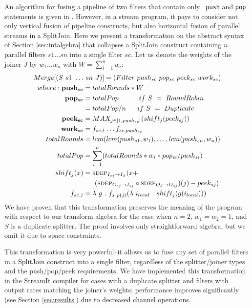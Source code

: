An algorithm for fusing a pipeline of two filters that contain only {\tt
push} and {\tt pop} statements is given in \cite{pro96}.  However, in a
stream program, it pays to consider not only vertical fusion of pipeline
constructs, but also horizontal fusion of parallel streams in a
SplitJoin.  Here we present a transformation on the abstract syntax of
Section \ref{sec:intalgebra} that collapses a SplitJoin construct
containing $n$ parallel filters $s1 \dots sn$ into a single filter $sc$.
Let us denote the weights of the joiner $J$ by $w_1 \dots w_n$ with $W =
\sum_{i=1}^{n}{w_i}$:
\begin{align*}
Merge[(S~s1~\dots&~sn~J)] = (Filter~push_{sc}~pop_{sc}~peek_{sc}~work_{sc}) \\
where: {\bf push_{sc}} &= totalRounds * W \\
       {\bf pop_{sc}} &= totalPop ~~~~~~~~~if~S~=~RoundRobin \\
                &= totalPop / n ~~~~~if~S~=~Duplicate \\
       {\bf peek_{sc}} &= MAX_{j \in [1,push_{sc}]}(shift_j(peek_{sj})) \\
       {\bf work_{sc}} &= f_{sc, 1} \dots f_{sc, push_{sc}} \\
       totalRounds &= lcm(lcm(push_{s1}, w_1), \dots, lcm(push_{sn},
       w_n)) \\
       totalPop &= \sum_{i=1}^{n}(totalRounds * w_i * pop_{si} / push_{si}) \\
       shift_j(x) &= \mi{I_S}{I_{sj}}(x + \\ &~~~~~(\mi{I_{sj}}{O_{sj}} \circ \mi{O_{sj}}{O_J})(j)-peek_{sj}) \\
       f_{sc, j} &= \la~g~.~f_{s~p(j)}(\la~i_{local}~.~shift_j(g(i_{local})))
\end{align*}
We have proven that this transformation preserves the meaning of the
program with respect to our transform algebra for the case when $n = 2$,
$w_1 = w_2 = 1$, and $S$ is a duplicate splitter.  The proof involves
only straightforward algebra, but we omit it due to space constraints.

This transformation is very powerful--it allows us to fuse any set of
parallel filters in a SplitJoin construct into a single filter,
regardless of the splitter/joiner types and the push/pop/peek
requirements.  We have implemented this transformation in the StreamIt
compiler for cases with a duplicate splitter and filters with output
rates matching the joiner's weights; performance improves significantly
(see Section \ref{sec:results}) due to decreased channel operations.

